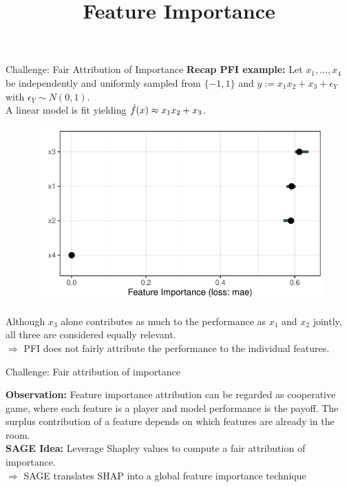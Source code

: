 \documentclass[11pt,compress,t,notes=noshow, xcolor=table]{beamer}
\title{Feature Importance}
\institute{\href{https://compstat-lmu.github.io/lecture_i2ml/}{compstat-lmu.github.io/lecture\_i2ml}}
\date{}
\begin{document}
	
	
	
	
	
	
	
	
	
	

\begin{vbframe}{Challenge: Fair Attribution of Importance}
\textbf{Recap PFI example:} Let $x_1, \dots, x_4$ be independently and uniformly sampled from $\{-1, 1\}$ and $y:= x_1 x_2 + x_3 + \epsilon_Y$ with $\epsilon_Y \sim N(0, 1)$.\\
A linear model is fit yielding $\fh(x) \approx x_1 x_2 + x_3$.\\

\begin{figure}
\centering
  \includegraphics[width=0.5\linewidth]{figure_man/pfi_interactions.pdf}
\end{figure}

Although $x_3$ alone contributes as much to the performance as $x_1$ and $x_2$ jointly, all three are considered equally relevant.\\
\lz
$\Rightarrow$ PFI does not fairly attribute the performance to the individual features.
\end{vbframe}


\begin{vbframe}{Challenge: Fair attribution of importance}

\textbf{Observation:} Feature importance attribution can be regarded as cooperative game, where each feature is a player and model performance is the payoff. The surplus contribution of a feature depends on which features are already in the room.\\
\lz
\textbf{SAGE Idea:} Leverage Shapley values to compute a fair attribution of importance.\\
\lz
$\Rightarrow$ SAGE translates SHAP into a global feature importance technique

\cite{NEURIPS2020_c7bf0b7c}
  
\end{vbframe}
\end{document}
